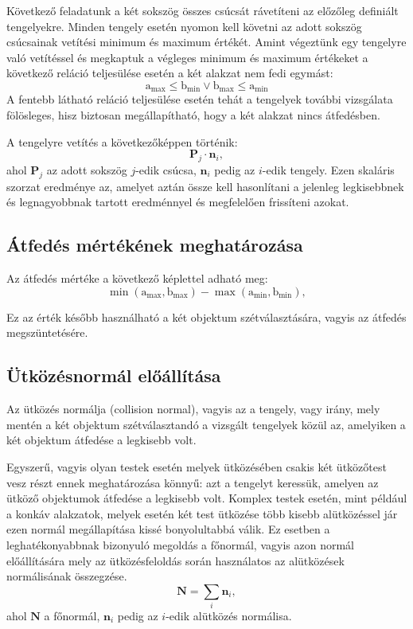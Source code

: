 \documentclass[12pt]{report}
\begin{document}
Következő feladatunk a két sokszög összes csúcsát rávetíteni az előzőleg definiált tengelyekre. Minden tengely esetén nyomon kell követni az adott sokszög csúcsainak vetítési minimum és maximum értékét. Amint végeztünk egy tengelyre való vetítéssel és megkaptuk a végleges minimum és maximum értékeket a következő reláció teljesülése esetén a két alakzat nem fedi egymást:
\[
    \text{a}_{\text{max}} \leq \text{b}_{\text{min}} \lor \text{b}_{\text{max}} \leq \text{a}_{\text{min}}
\]
A fentebb látható reláció teljesülése esetén tehát a tengelyek további vizsgálata fölösleges, hisz biztosan megállapítható, hogy a két alakzat nincs átfedésben.

A tengelyre vetítés a következőképpen történik:
\[
    \mathbf{P}_j \cdot \mathbf{n}_i,
\]
ahol $\mathbf{P}_j$ az adott sokszög $j$-edik csúcsa, $\mathbf{n}_i$ pedig az $i$-edik tengely. Ezen skaláris szorzat eredménye az, amelyet aztán össze kell hasonlítani a jelenleg legkisebbnek és legnagyobbnak tartott eredménnyel és megfelelően frissíteni azokat.

\subsection{Átfedés mértékének meghatározása}

Az átfedés mértéke a következő képlettel adható meg:
\[
    \min(\text{a}_{\text{max}}, \text{b}_{\text{max}}) - \max(\text{a}_{\text{min}}, \text{b}_{\text{min}}),
\]

Ez az érték később használható a két objektum szétválasztására, vagyis az átfedés megszüntetésére.

\subsection{Ütközésnormál előállítása}

Az ütközés normálja (collision normal), vagyis az a tengely, vagy irány, mely mentén a két objektum szétválasztandó a vizsgált tengelyek közül az, amelyiken a két objektum átfedése a legkisebb volt.

Egyszerű, vagyis olyan testek esetén melyek ütközésében csakis két ütközőtest vesz részt ennek meghatározása könnyű: azt a tengelyt keressük, amelyen az ütköző objektumok átfedése a legkisebb volt.
Komplex testek esetén, mint például a konkáv alakzatok, melyek esetén két test ütközése több kisebb alütközéssel jár ezen normál megállapítása kissé bonyolultabbá válik.
Ez esetben a leghatékonyabbnak bizonyuló megoldás a főnormál, vagyis azon normál előállítására mely az ütközésfeloldás során használatos az alütközések normálisának összegzése.
\[
    \mathbf{N} = \sum_{i} \mathbf{n}_i,
\]
ahol $\mathbf{N}$ a főnormál, $\mathbf{n}_i$ pedig az $i$-edik alütközés normálisa.
\end{document}
